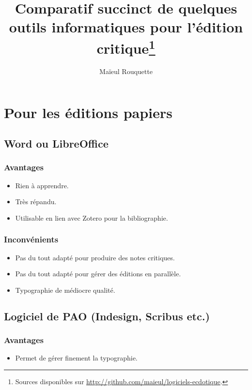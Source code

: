 \documentclass{article}
\begin{document}
\author{Maïeul Rouquette}
\title{Comparatif succinct de quelques outils informatiques pour l'édition critique\footnote{Sources disponibles sur \url{http://github.com/maieul/logiciels-ecdotique}.}}

\maketitle\thispagestyle{fancy}
\tableofcontents
\section{Pour les éditions papiers}
\subsection{Word ou LibreOffice}

\subsubsection{Avantages}
\begin{itemize}
	\item Rien à apprendre.
	\item Très répandu.
	\item Utilisable en lien avec Zotero pour la bibliographie.
\end{itemize}

\subsubsection{Inconvénients}
\begin{itemize}
	\item Pas du tout adapté pour produire des notes critiques.
	\item Pas du tout adapté pour gérer des éditions en parallèle.
	\item Typographie de médiocre qualité.
\end{itemize}

\subsection{Logiciel de PAO (Indesign, Scribus etc.)}

\subsubsection{Avantages}
\begin{itemize}
	\item Permet de gérer finement la typographie.
\end{itemize}
\end{document}
